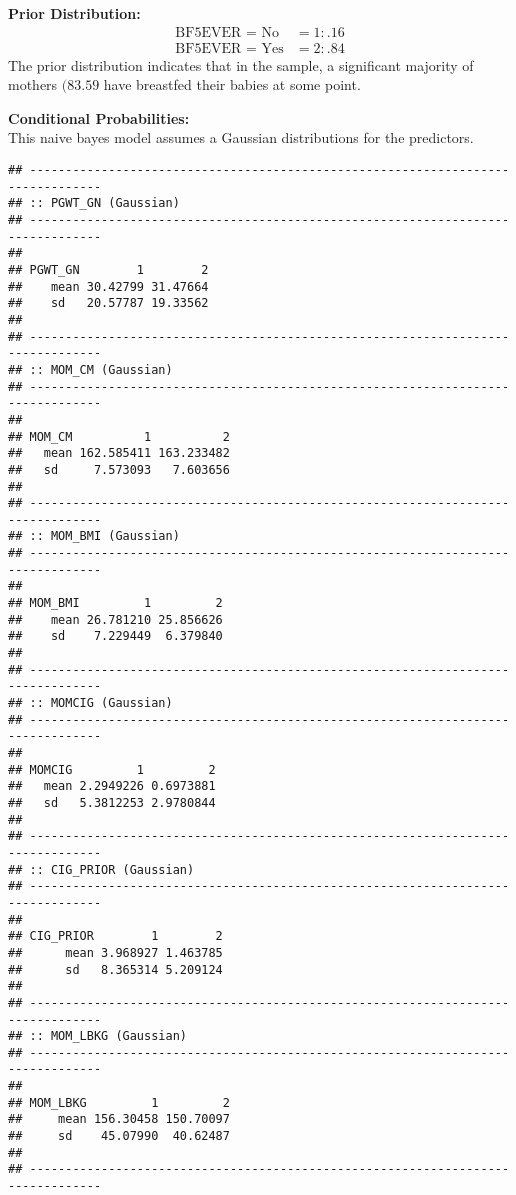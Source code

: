 \documentclass[
]{article}
\newenvironment{Shaded}{\begin{snugshade}}{\end{snugshade}}
\newcommand{\CommentTok}[1]{\textcolor[rgb]{0.56,0.35,0.01}{\textit{#1}}}
\newcommand{\NormalTok}[1]{#1}
\newcommand{\SpecialCharTok}[1]{\textcolor[rgb]{0.81,0.36,0.00}{\textbf{#1}}}
\begin{document}
\textbf{Prior Distribution:}\\
\[
\begin{aligned}
   \text{BF5EVER = No}  &= 1: .16 \\
   \text{BF5EVER = Yes} &= 2: .84
\end{aligned}
\] The prior distribution indicates that in the sample, a significant
majority of mothers \((83.59%
\) have breastfed their babies at some point.

\textbf{Conditional Probabilities:}\\
This naive bayes model assumes a Gaussian distributions for the
predictors.\\

\begin{Shaded}
\end{Shaded}

\begin{verbatim}
## -------------------------------------------------------------------------------- 
## :: PGWT_GN (Gaussian) 
## -------------------------------------------------------------------------------- 
##        
## PGWT_GN        1        2
##    mean 30.42799 31.47664
##    sd   20.57787 19.33562
## 
## -------------------------------------------------------------------------------- 
## :: MOM_CM (Gaussian) 
## -------------------------------------------------------------------------------- 
##       
## MOM_CM          1          2
##   mean 162.585411 163.233482
##   sd     7.573093   7.603656
## 
## -------------------------------------------------------------------------------- 
## :: MOM_BMI (Gaussian) 
## -------------------------------------------------------------------------------- 
##        
## MOM_BMI         1         2
##    mean 26.781210 25.856626
##    sd    7.229449  6.379840
## 
## -------------------------------------------------------------------------------- 
## :: MOMCIG (Gaussian) 
## -------------------------------------------------------------------------------- 
##       
## MOMCIG         1         2
##   mean 2.2949226 0.6973881
##   sd   5.3812253 2.9780844
## 
## -------------------------------------------------------------------------------- 
## :: CIG_PRIOR (Gaussian) 
## -------------------------------------------------------------------------------- 
##          
## CIG_PRIOR        1        2
##      mean 3.968927 1.463785
##      sd   8.365314 5.209124
## 
## -------------------------------------------------------------------------------- 
## :: MOM_LBKG (Gaussian) 
## -------------------------------------------------------------------------------- 
##         
## MOM_LBKG         1         2
##     mean 156.30458 150.70097
##     sd    45.07990  40.62487
## 
## --------------------------------------------------------------------------------
\end{verbatim}
\end{document}
